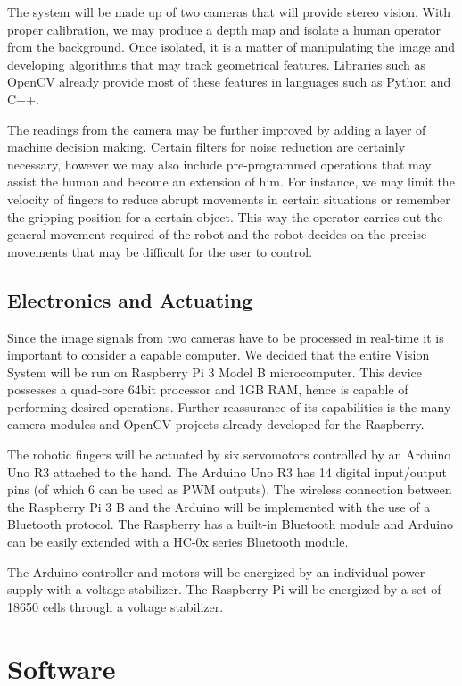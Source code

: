 \documentclass{article}
\begin{document}
The system will be made up of two cameras that will provide stereo vision. With proper calibration, we may produce a depth map and isolate a human operator from the background. Once isolated, it is a matter of manipulating the image and developing algorithms that may track geometrical features. Libraries such as OpenCV already provide most of these features in languages such as Python and C++.

The readings from the camera may be further improved by adding a layer of machine decision making. Certain filters for noise reduction are certainly necessary, however we may also include pre-programmed operations that may assist the human and become an extension of him. For instance, we may limit the velocity of fingers to reduce abrupt movements in certain situations or remember the gripping position for a certain object. This way the operator carries out the general movement required of the robot and the robot decides on the precise movements that may be difficult for the user to control. 

\subsection{Electronics and Actuating}

Since the image signals from two cameras have to be processed in real-time it is important to consider a capable computer. We decided that the entire Vision System will be run on Raspberry Pi 3 Model B microcomputer. This device possesses a quad-core 64bit processor and 1GB RAM, hence is capable of performing desired operations. Further reassurance of its capabilities is the many camera modules and OpenCV projects already developed for the Raspberry.

The robotic fingers will be actuated by six servomotors controlled by an Arduino Uno R3 attached to the hand. The Arduino Uno R3 has 14 digital input/output pins (of which 6 can be used as PWM outputs). The wireless connection between the Raspberry Pi 3 B and the Arduino will be implemented with the use of a Bluetooth protocol. The Raspberry has a built-in Bluetooth module and Arduino can be easily extended with a HC-0x series Bluetooth module.

The Arduino controller and motors will be energized by an individual power supply with a voltage stabilizer. The Raspberry Pi will be energized by a set of 18650 cells through a voltage stabilizer.

\break
\section{Software}
\end{document}
